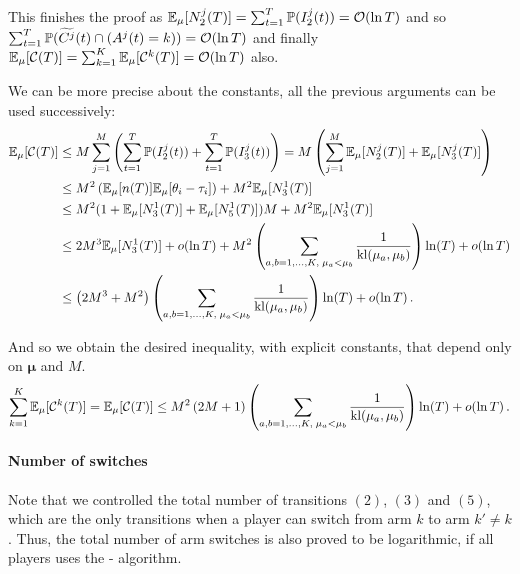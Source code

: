 This finishes the proof as $\mathbb{E}_{\mu}[N_2^j(T)] = \sum_{t=1}^T \mathbb{P}(I_2^j(t)) = \mathop{}\mathopen{}\mathcal{O}\mathopen{}\left(\ln T\right)$ and so
$\sum_{t=1}^T \mathbb{P}(\widetilde{C^j}(t) \cap (A^j(t) = k)) = \mathop{}\mathopen{}\mathcal{O}\mathopen{}\left(\ln T\right)$
and finally
$\mathbb{E}_{\mu}[\mathcal{C}(T)] = \sum_{k=1}^K \mathbb{E}_{\mu}[\mathcal{C}^k(T)] = \mathop{}\mathopen{}\mathcal{O}\mathopen{}\left(\ln T\right)$ also.

We can be more precise about the constants, all the previous arguments can be used successively:
\begin{align}
  \mathbb{E}_{\mu}[\mathcal{C}(T)]
  &\leq M \sum_{j=1}^M \left(\sum_{t=1}^T \mathbb{P}(I_2^j(t)) + \sum_{t=1}^T \mathbb{P}(I_3^j(t))\right)
  = M \left(\sum_{j=1}^M \mathbb{E}_{\mu}[N_2^j(T)] + \mathbb{E}_{\mu}[N_3^j(T)]\right) \\
  &\leq M^2 \left(\mathbb{E}_{\mu}[n(T)] \mathbb{E}_{\mu}[\theta_i - \tau_i] \right) + M^2 \mathbb{E}_{\mu}[N_3^1(T)] \notag  \\
  &\leq M^2 (1+\mathbb{E}_{\mu}[N_3^1(T)] + \mathbb{E}_{\mu}[N_5^1(T)]) M + M^2 \mathbb{E}_{\mu}[N_3^1(T)] \notag \\
  &\leq 2 M^3 \mathbb{E}_{\mu}[N_3^1(T)] + \mathop{}\mathopen{}o\mathopen{}\left(\ln T\right) + M^2 \left(\sum_{a,b=1,\dots,K,\;\mu_a < \mu_b} \frac{1}{\mathrm{kl}(\mu_a,\mu_b)}\right) \ln(T) + \mathop{}\mathopen{}o\mathopen{}\left(\ln T\right) \notag  \\
  &\leq \left(2 M^3 + M^2\right) \left(\sum_{a,b=1,\dots,K,\;\mu_a < \mu_b} \frac{1}{\mathrm{kl}(\mu_a,\mu_b)}\right) \ln(T) + \mathop{}\mathopen{}o\mathopen{}\left(\ln T\right).
\end{align}

And so we obtain the desired inequality, with explicit constants, that depend only on $\boldsymbol{\mu}$ and $M$.
%
\begin{equation}
  \sum_{k=1}^K \mathbb{E}_{\mu}[\mathcal{C}^k(T)] = \mathbb{E}_{\mu}[\mathcal{C}(T)]
  \leq M^2\left(2 M + 1\right) \left(\sum_{a,b=1,\dots,K,\;\mu_a < \mu_b} \frac{1}{\mathrm{kl}(\mu_a,\mu_b)}\right) \ln(T) + \mathop{}\mathopen{}o\mathopen{}\left(\ln T\right).
\end{equation}


\paragraph{Number of switches}\label{app:5:NumberSwitches}
%
Note that we controlled the total number of transitions $(2)$, $(3)$ and $(5)$,
which are the only transitions when a player can switch from arm $k$ to arm $k'\neq k$.
Thus, the total number of arm switches is also proved to be logarithmic, if all players uses
the \MCTopM-\klUCB{} algorithm.


